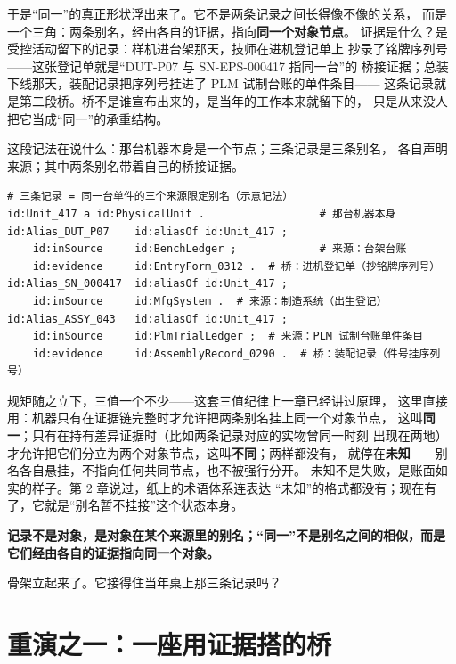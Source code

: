 于是“同一”的真正形状浮出来了。它不是两条记录之间长得像不像的关系，
而是一个三角：两条别名，经由各自的证据，指向\textbf{同一个对象节点}。
证据是什么？是受控活动留下的记录：样机进台架那天，技师在进机登记单上
抄录了铭牌序列号——这张登记单就是“DUT-P07 与 SN-EPS-000417 指同一台”的
桥接证据；总装下线那天，装配记录把序列号挂进了 PLM 试制台账的单件条目——
这条记录就是第二段桥。桥不是谁宣布出来的，是当年的工作本来就留下的，
只是从来没人把它当成“同一”的承重结构。

这段记法在说什么：那台机器本身是一个节点；三条记录是三条别名，
各自声明来源；其中两条别名带着自己的桥接证据。

\nopagebreak[4]
\begin{codebox}
\begin{Verbatim}[fontsize=\small,breaklines=true,breakanywhere=true,breaksymbolleft={},breaksymbolright={}]
# 三条记录 = 同一台单件的三个来源限定别名（示意记法）
id:Unit_417 a id:PhysicalUnit .                  # 那台机器本身
id:Alias_DUT_P07    id:aliasOf id:Unit_417 ;
    id:inSource     id:BenchLedger ;             # 来源：台架台账
    id:evidence     id:EntryForm_0312 .  # 桥：进机登记单（抄铭牌序列号）
id:Alias_SN_000417  id:aliasOf id:Unit_417 ;
    id:inSource     id:MfgSystem .  # 来源：制造系统（出生登记）
id:Alias_ASSY_043   id:aliasOf id:Unit_417 ;
    id:inSource     id:PlmTrialLedger ;  # 来源：PLM 试制台账单件条目
    id:evidence     id:AssemblyRecord_0290 .  # 桥：装配记录（件号挂序列号）
\end{Verbatim}
\end{codebox}

规矩随之立下，三值一个不少——这套三值纪律上一章已经讲过原理，
这里直接用：机器只有在证据链完整时才允许把两条别名挂上同一个对象节点，
这叫\textbf{同一}；只有在持有差异证据时（比如两条记录对应的实物曾同一时刻
出现在两地）才允许把它们分立为两个对象节点，这叫\textbf{不同}；两样都没有，
就停在\textbf{未知}——别名各自悬挂，不指向任何共同节点，也不被强行分开。
未知不是失败，是账面如实的样子。第 2 章说过，纸上的术语体系连表达
“未知”的格式都没有；现在有了，它就是“别名暂不挂接”这个状态本身。

\textbf{记录不是对象，是对象在某个来源里的别名；“同一”不是别名之间的相似，而是它们经由各自的证据指向同一个对象。}

骨架立起来了。它接得住当年桌上那三条记录吗？

\section{重演之一：一座用证据搭的桥}

